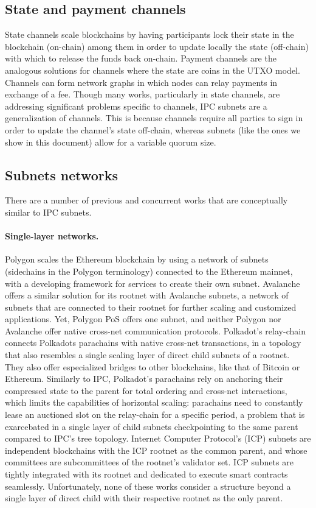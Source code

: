     \subsection{State and payment channels} State channels scale blockchains by having participants lock their state in the blockchain (on-chain) among them in order to update locally the state (off-chain) with which to release the funds back on-chain. Payment channels are the analogous solutions for channels where the state are coins in the UTXO model. Channels can form network graphs in which nodes can relay payments in exchange of a fee. Though many works, particularly in state channels, are addressing significant problems specific to channels, IPC subnets are a generalization of channels. This is because channels require all parties to sign in order to update the channel's state off-chain, whereas subnets (like the ones we show in this document) allow for a variable quorum size. 

    \subsection{Subnets networks}
    There are a number of previous and concurrent works that are conceptually similar to IPC subnets. 
    
    \paragraph{Single-layer networks.} Polygon scales the Ethereum blockchain by using a network of subnets (sidechains in the Polygon terminology) connected to the Ethereum mainnet, with a developing framework for services to create their own subnet. Avalanche offers a similar solution for its rootnet with Avalanche subnets, a network of subnets that are connected to their rootnet for further scaling and customized applications. Yet, Polygon PoS offers one subnet, and neither Polygon nor Avalanche offer native cross-net communication protocols. Polkadot's relay-chain connects Polkadots parachains with native cross-net transactions, in a topology that also resembles a single scaling layer of direct child subnets of a rootnet. They also offer especialized bridges to other blockchains, like that of Bitcoin or Ethereum.  Similarly to IPC, Polkadot's parachains rely on anchoring their compressed state to the parent for total ordering and cross-net interactions, which limits the capabilities of horizontal scaling: parachains need to constantly lease an auctioned slot on the relay-chain for a specific period, a problem that is exarcebated in a single layer of child subnets checkpointing to the same parent compared to IPC's tree topology. Internet Computer Protocol's (ICP) subnets are independent blockchains with the ICP rootnet as the common parent, and whose committees are subcommittees of the rootnet's validator set. ICP subnets are tightly integrated with its rootnet and dedicated to execute smart contracts seamlessly. Unfortunately, none of these works consider a structure beyond a single layer of direct child with their respective rootnet as the only parent. 

